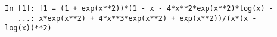 ﻿\documentclass{article}
\begin{document}
\normalsize
\begin{Verbatim}
In [1]: f1 = (1 + exp(x**2))*(1 - x - 4*x**2*exp(x**2)*log(x) - 
   ...: x*exp(x**2) + 4*x**3*exp(x**2) + exp(x**2))/(x*(x - log(x))**2)
\end{Verbatim}
\end{document}
